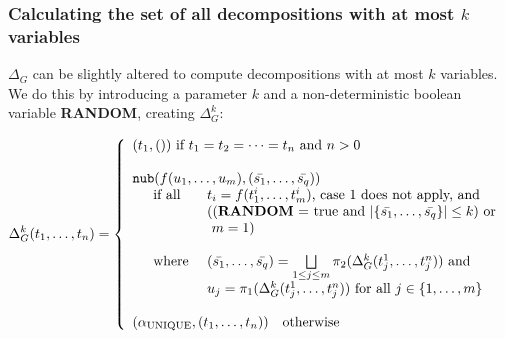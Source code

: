 \documentclass[a4paper, 11pt]{report}
\newcommand{\mt}[1]{\textnormal{#1}}
\begin{document}
\subsubsection{Calculating the set of all decompositions with at most $k$ variables}

$\Delta_G$ can be slightly altered to compute decompositions with at most $k$ variables. We do this by introducing a parameter $k$ and a non-deterministic boolean variable \textbf{RANDOM}, creating $\Delta_G^k$:

$$
  \Delta_G^k(t_1,\dots,t_n) = \left\{
    \begin{array}{l}

    (t_1,()) \mt{ if } t_1 = t_2 = \dots = t_n \mt{ and } n > 0\\
    \\

    \texttt{nub}(f(u_1,\dots,u_m), (\bar{s_1},\dots,\bar{s_q}))
    \\
    \quad
    \begin{array}{l l}
      \mt{if all } & t_i = f(t_1^i,\dots,t_m^i) \mt{, case 1 does not apply, and}\\
      & ((\textbf{RANDOM} \mt{ = true and } |\{\bar{s_1},\dots,\bar{s_q}\}| \leq k) \mt{ or}\\
      & \ m = 1)\\
      \\
      \mt{where } & (\bar{s_1},\dots,\bar{s_q}) = \bigsqcup\limits_{1 \leq j \leq m} \pi_2(\Delta_G^k(t_j^1,\dots,t_j^n)) \mt{ and}\\
                  & u_j = \pi_1(\Delta_G^k(t_j^1,\dots,t_j^n)) \mt{ for all } j \in \{1,\dots,m \}\\
    \end{array}
    
    \\
    \\
    
    (\alpha_{\mt{UNIQUE}},(t_1,\dots,t_n))\quad \mt{otherwise}\\
    \end{array}
  \right.
$$
\end{document}
